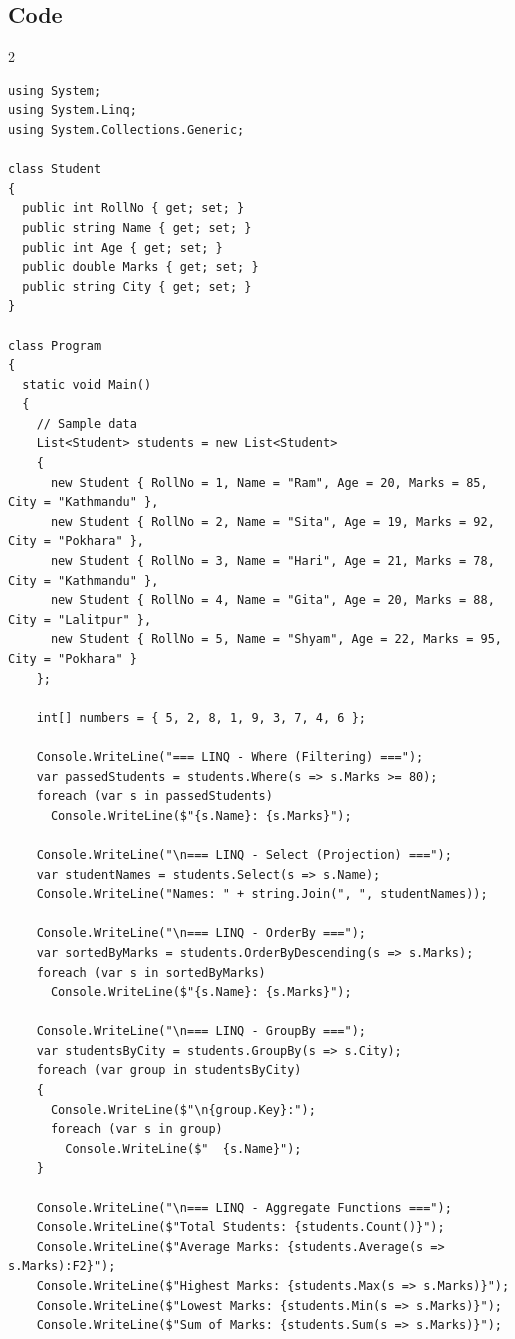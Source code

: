 \documentclass[10pt,a4paper]{article}
\begin{document}
\subsection*{Code}
\begin{multicols}{2}
\begin{lstlisting}
using System;
using System.Linq;
using System.Collections.Generic;

class Student
{
  public int RollNo { get; set; }
  public string Name { get; set; }
  public int Age { get; set; }
  public double Marks { get; set; }
  public string City { get; set; }
}

class Program
{
  static void Main()
  {
    // Sample data
    List<Student> students = new List<Student>
    {
      new Student { RollNo = 1, Name = "Ram", Age = 20, Marks = 85, City = "Kathmandu" },
      new Student { RollNo = 2, Name = "Sita", Age = 19, Marks = 92, City = "Pokhara" },
      new Student { RollNo = 3, Name = "Hari", Age = 21, Marks = 78, City = "Kathmandu" },
      new Student { RollNo = 4, Name = "Gita", Age = 20, Marks = 88, City = "Lalitpur" },
      new Student { RollNo = 5, Name = "Shyam", Age = 22, Marks = 95, City = "Pokhara" }
    };
    
    int[] numbers = { 5, 2, 8, 1, 9, 3, 7, 4, 6 };
    
    Console.WriteLine("=== LINQ - Where (Filtering) ===");
    var passedStudents = students.Where(s => s.Marks >= 80);
    foreach (var s in passedStudents)
      Console.WriteLine($"{s.Name}: {s.Marks}");
    
    Console.WriteLine("\n=== LINQ - Select (Projection) ===");
    var studentNames = students.Select(s => s.Name);
    Console.WriteLine("Names: " + string.Join(", ", studentNames));
    
    Console.WriteLine("\n=== LINQ - OrderBy ===");
    var sortedByMarks = students.OrderByDescending(s => s.Marks);
    foreach (var s in sortedByMarks)
      Console.WriteLine($"{s.Name}: {s.Marks}");
    
    Console.WriteLine("\n=== LINQ - GroupBy ===");
    var studentsByCity = students.GroupBy(s => s.City);
    foreach (var group in studentsByCity)
    {
      Console.WriteLine($"\n{group.Key}:");
      foreach (var s in group)
        Console.WriteLine($"  {s.Name}");
    }
    
    Console.WriteLine("\n=== LINQ - Aggregate Functions ===");
    Console.WriteLine($"Total Students: {students.Count()}");
    Console.WriteLine($"Average Marks: {students.Average(s => s.Marks):F2}");
    Console.WriteLine($"Highest Marks: {students.Max(s => s.Marks)}");
    Console.WriteLine($"Lowest Marks: {students.Min(s => s.Marks)}");
    Console.WriteLine($"Sum of Marks: {students.Sum(s => s.Marks)}");
    

\end{lstlisting}
\end{multicols}
\end{document}
